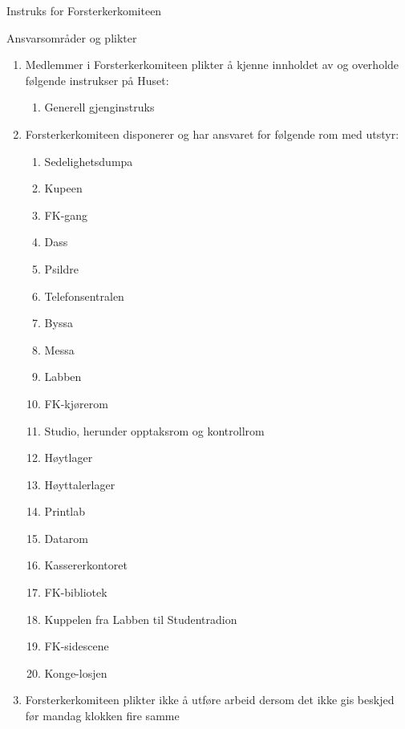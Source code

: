 \begin{instruks}{Instruks for Forsterkerkomiteen}{}{}
    \begin{instruksledd}{Ansvarsområder og plikter}
        \begin{enumerate}
            \item Medlemmer i Forsterkerkomiteen plikter å kjenne innholdet av og overholde følgende
                instrukser på Huset:
                \begin{enumerate}
                    \item Generell gjenginstruks
                \end{enumerate}
            \item Forsterkerkomiteen disponerer og har ansvaret for følgende rom med utstyr:
                \begin{enumerate}
                    \item Sedelighetsdumpa
                    \item Kupeen
                    \item FK-gang
                    \item Dass
                    \item Psildre
                    \item Telefonsentralen
                    \item Byssa
                    \item Messa
                    \item Labben
                    \item FK-kjørerom
                    \item Studio, herunder opptaksrom og kontrollrom
                    \item Høytlager
                    \item Høyttalerlager
                    \item Printlab
                    \item Datarom
                    \item Kassererkontoret
                    \item FK-bibliotek
                    \item Kuppelen fra Labben til Studentradion
                    \item FK-sidescene
                    \item Konge-losjen
                \end{enumerate}
            \item Forsterkerkomiteen plikter ikke å utføre arbeid dersom det ikke gis beskjed
                før mandag klokken fire samme

\end{enumerate}
\end{instruksledd}
\end{instruks}
